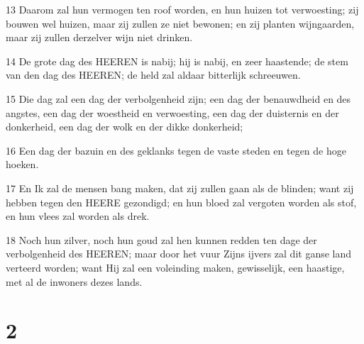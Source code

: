 \par 13 Daarom zal hun vermogen ten roof worden, en hun huizen tot verwoesting; zij bouwen wel huizen, maar zij zullen ze niet bewonen; en zij planten wijngaarden, maar zij zullen derzelver wijn niet drinken.
\par 14 De grote dag des HEEREN is nabij; hij is nabij, en zeer haastende; de stem van den dag des HEEREN; de held zal aldaar bitterlijk schreeuwen.
\par 15 Die dag zal een dag der verbolgenheid zijn; een dag der benauwdheid en des angstes, een dag der woestheid en verwoesting, een dag der duisternis en der donkerheid, een dag der wolk en der dikke donkerheid;
\par 16 Een dag der bazuin en des geklanks tegen de vaste steden en tegen de hoge hoeken.
\par 17 En Ik zal de mensen bang maken, dat zij zullen gaan als de blinden; want zij hebben tegen den HEERE gezondigd; en hun bloed zal vergoten worden als stof, en hun vlees zal worden als drek.
\par 18 Noch hun zilver, noch hun goud zal hen kunnen redden ten dage der verbolgenheid des HEEREN; maar door het vuur Zijns ijvers zal dit ganse land verteerd worden; want Hij zal een voleinding maken, gewisselijk, een haastige, met al de inwoners dezes lands.

\chapter{2}

